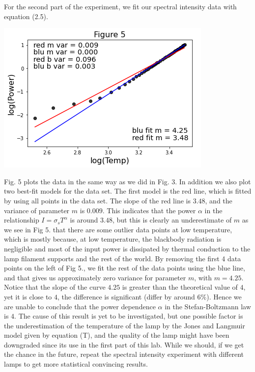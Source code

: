\documentclass[11pt]{book}
\theoremstyle{break}
\theoremstyle{break}
\begin{document}
\newpage
For the second part of the experiment, we fit our spectral intensity data with equation (2.5).
\begin{center}
\includegraphics[scale=0.65]{radLinFit.png}
\end{center}
Fig. 5 plots the data in the same way as we did in Fig. 3. In addition we also plot two best-fit models for the data set. The first model is the red line, which is fitted by using all points in the data set. The slope of the red line is $3.48$, and the variance of parameter $m$ is  $0.009$. This indicates that the power $\alpha$ in the relationship $I = \sigma_s T^\alpha$ is around $3.48$, but this is clearly an underestimate of $m$ as we see in Fig 5. that there are some outlier data points at low temperature, which is mostly because, at low temperature, the blackbody radiation is negligible and most of the input power is dissipated by thermal conduction to the lamp filament supports and the rest of the world. By removing the first 4 data points on the left of Fig 5., we fit the rest of the data points using the blue line, and that gives us approximately zero variance for parameter $m$, with $m=4.25$. Notice that the slope of the curve $4.25$ is greater than the theoretical value of $4$, yet it is close to $4$, the difference is significant (differ by around $6\%$). Hence we are unable to conclude that the power dependence $\alpha$ in the Stefan-Boltzmann law is $4$. The cause of this result is yet to be investigated, but one possible factor is the underestimation of the temperature of the lamp by the Jones and Langmuir model given by equation (T), and the quality of the lamp might have been downgraded since its use in the first part of this lab. While we should, if we get the chance in the future, repeat the spectral intensity experiment with different lamps to get more statistical convincing results.\\
\end{document}
